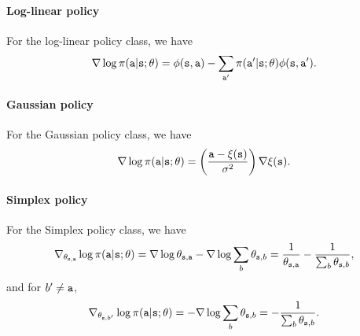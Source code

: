 \paragraph{Log-linear policy}
For the log-linear policy class,  we have 
\[
\nabla \log \pi({\tt a}|{\tt s};\theta)= \phi({\tt s},{\tt a}) - \sum_{{\tt a}'}\pi({\tt a}'|{\tt s};\theta)\phi({\tt s},{\tt a}').
\]

\paragraph{Gaussian policy} For the Gaussian policy class, we have \[
\nabla \log
\pi({\tt a}|{\tt s};\theta) = 
\left(\frac{{\tt a}-\xi({\tt s})}{\sigma^2}\right) \nabla \xi({\tt s}).
\]

\paragraph{Simplex policy} For the Simplex policy class, we have 
\[
\nabla_{\theta_{{\tt s},{\tt a}}} \log
\pi({\tt a}|{\tt s};\theta) = \nabla \log \theta_{{\tt s},{\tt a}} - \nabla\log \sum_b \theta_{{\tt s},b}=
\frac{1}{\theta_{{\tt s},{\tt a}}}-\frac{1}{\sum_b \theta_{{\tt s},b}},
\]
and for $b'\neq {\tt a}$,
\[
\nabla_{\theta_{{\tt s},b'}} \log
\pi({\tt a}|{\tt s};\theta) =  - \nabla\log \sum_b \theta_{{\tt s},b}=
-\frac{1}{\sum_b \theta_{{\tt s},b}}.
\]



